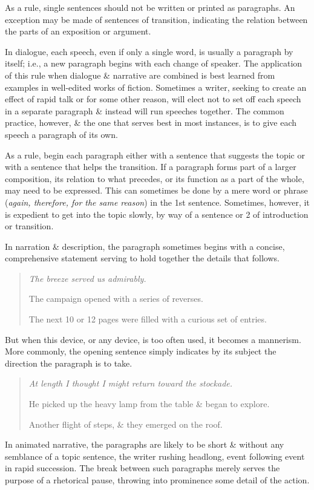 \documentclass{article}
\begin{document}
As a rule, single sentences should not be written or printed as paragraphs. An exception may be made of sentences of transition, indicating the relation between the parts of an exposition or argument.

In dialogue, each speech, even if only a single word, is usually a paragraph by itself; i.e., a new paragraph begins with each change of speaker. The application of this rule when dialogue \& narrative are combined is best learned from examples in well-edited works of fiction. Sometimes a writer, seeking to create an effect of rapid talk or for some other reason, will elect not to set off each speech in a separate paragraph \& instead will run speeches together. The common practice, however, \& the one that serves best in most instances, is to give each speech a paragraph of its own.

As a rule, begin each paragraph either with a sentence that suggests the topic or with a sentence that helps the transition. If a paragraph forms part of a larger composition, its relation to what precedes, or its function as a part of the whole, may need to be expressed. This can sometimes be done by a mere word or phrase ({\it again, therefore, for the same reason}) in the 1st sentence. Sometimes, however, it is expedient to get into the topic slowly, by way of a sentence or 2 of introduction or transition.

In narration \& description, the paragraph sometimes begins with a concise, comprehensive statement serving to hold together the details that follows.
\begin{quotation}\it
	The breeze served us admirably.
	
	The campaign opened with a series of reverses.
	
	The next 10 or 12 pages were filled with a curious set of entries.
\end{quotation}
But when this device, or any device, is too often used, it becomes a mannerism. More commonly, the opening sentence simply indicates by its subject the direction the paragraph is to take.
\begin{quotation}\it
	At length I thought I might return toward the stockade.
	
	He picked up the heavy lamp from the table \& began to explore.
	
	Another flight of steps, \& they emerged on the roof.
\end{quotation}
In animated narrative, the paragraphs are likely to be short \& without any semblance of a topic sentence, the writer rushing headlong, event following event in rapid succession. The break between such paragraphs merely serves the purpose of a rhetorical pause, throwing into prominence some detail of the action.
\end{document}
